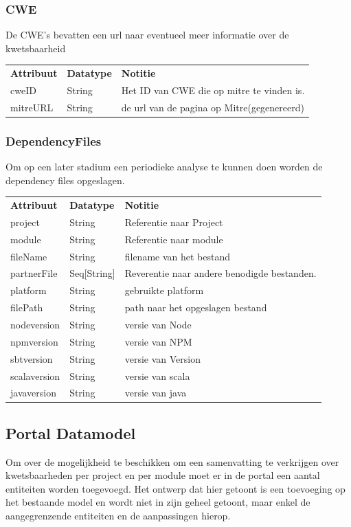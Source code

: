 \subsubsection{CWE}\label{subsubsec:cwe}
De CWE's bevatten een url naar eventueel meer informatie over de kwetsbaarheid

\begin{tabular}{lll}
    \textbf{Attribuut} & \textbf{Datatype} & \textbf{Notitie}\\
    cweID & String & Het ID van CWE die op mitre te vinden is.\\
    mitreURL & String & de url van de pagina op Mitre(gegenereerd)\\
\end{tabular}

\subsubsection{DependencyFiles}\label{subsubsec:dependencyFiles}
Om op een later stadium een periodieke analyse te kunnen doen worden de dependency files opgeslagen.

\begin{tabular}{lll}
    \textbf{Attribuut} & \textbf{Datatype} & \textbf{Notitie}\\
    project & String & Referentie naar Project\\
    module & String & Referentie naar module \\
    fileName & String & filename van het bestand \\
    partnerFile & Seq[String] & Reverentie naar andere benodigde bestanden.\\
    platform & String & gebruikte platform \\
    filePath & String & path naar het opgeslagen bestand \\
    nodeversion & String & versie van Node  \\
    npmversion & String & versie van NPM  \\
    sbtversion & String & versie van Version  \\
    scalaversion & String & versie van scala  \\
    javaversion & String & versie van java \\
\end{tabular}

\subsection{Portal Datamodel}\label{subsec:portal-datamodel}
Om over de mogelijkheid te beschikken om een samenvatting te verkrijgen over kwetsbaarheden per project en per module moet er in de portal een aantal entiteiten worden toegevoegd. Het ontwerp dat hier getoont is een toevoeging op het bestaande model en wordt niet in zijn geheel getoont, maar enkel de aangegrenzende entiteiten en de aanpassingen hierop.

